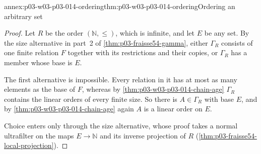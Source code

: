 \begin{annexitem}{annex:p03-w03-p03-014-ordering}{thm:p03-w03-p03-014-ordering}{Ordering an arbitrary set}
\begin{proof}
Let \(R\) be the order \((\mathbb N,\leq)\), which is infinite, and let
\(E\) be any set. By the size alternative in part~2 of
\cref{thm:p03-fraisse54-gamma}, either \(\Gamma_R\) consists of one
finite relation \(F\) together with its restrictions and their copies,
or \(\Gamma_R\) has a member whose base is \(E\).

The first alternative is impossible. Every relation in it has at most as
many elements as the base of \(F\), whereas by
\cref{thm:p03-w03-p03-014-chain-age} \(\Gamma_R\) contains the
linear orders of every finite size. So there is \(A\in\Gamma_R\) with
base \(E\), and by \cref{thm:p03-w03-p03-014-chain-age} again
\(A\) is a linear order on \(E\).

Choice enters only through the size alternative, whose proof takes a
normal ultrafilter on the maps \(E\to\mathbb N\) and its inverse
projection of \(R\) (\cref{thm:p03-fraisse54-local-projection}).
\end{proof}
\end{annexitem}

